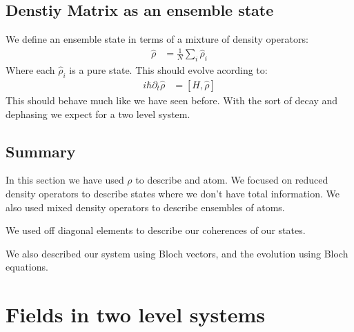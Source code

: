 \subsection{Denstiy Matrix as an ensemble state}
We define an ensemble state in terms of a mixture of density operators:
\begin{align*}
	\hat{\rho} &= \frac{1}{N} \sum_i \hat{\rho}_i
\end{align*}
Where each $\hat{\rho}_i$ is a pure state. This should evolve acording to:
\begin{align*}
	i\hbar \partial_t \hat{\rho} &= [H,\hat{\rho}]
\end{align*}
This should behave much like we have seen before. With the sort of decay and dephasing we expect for a two level system.
\subsection{Summary}
In this section we have used $\rho$ to describe and atom. We focused on reduced density operators to describe states where we don't have total information. We also used mixed density operators to describe ensembles of atoms.

We used off diagonal elements to describe our coherences of our states.

We also described our system using Bloch vectors, and the evolution using Bloch equations.
\section{Fields in two level systems}
